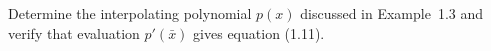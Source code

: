 

Determine the interpolating polynomial $p(x)$ discussed in Example~1.3
and verify that evaluation $p'(\bar x)$ gives equation (1.11).

